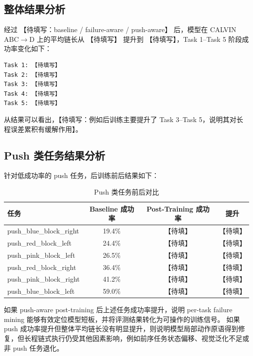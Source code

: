 \documentclass[10pt,a4paper,fontset=none]{ctexart}
\newcommand{\todo}[1]{\textcolor{TodoRed}{【#1】}}
\begin{document}
\subsection{整体结果分析}

经过 \todo{待填写：baseline / failure-aware / push-aware} 后，模型在 CALVIN ABC$\rightarrow$D 上的平均链长从 \todo{待填写} 提升到 \todo{待填写}，Task 1--Task 5 阶段成功率变化如下：

\begin{lstlisting}[caption={Task 1--5 阶段成功率变化}]
Task 1: 【待填写】
Task 2: 【待填写】
Task 3: 【待填写】
Task 4: 【待填写】
Task 5: 【待填写】
\end{lstlisting}

从结果可以看出，\todo{待填写：例如后训练主要提升了 Task 3--Task 5，说明其对长程误差累积有缓解作用}。

\subsection{Push 类任务结果分析}

针对低成功率的 push 任务，后训练前后结果如下：

\begin{table}[H]
\centering
\caption{Push 类任务前后对比}
\small
\begin{tabularx}{0.95\textwidth}{>{\ttfamily\raggedright\arraybackslash}Xccc}
\toprule
任务 & Baseline 成功率 & Post-Training 成功率 & 提升 \\
\midrule
push\_blue\_block\_right & 19.4\% & \todo{待填} & \todo{待填} \\
push\_red\_block\_left & 24.4\% & \todo{待填} & \todo{待填} \\
push\_pink\_block\_left & 26.5\% & \todo{待填} & \todo{待填} \\
push\_red\_block\_right & 36.4\% & \todo{待填} & \todo{待填} \\
push\_pink\_block\_right & 41.2\% & \todo{待填} & \todo{待填} \\
push\_blue\_block\_left & 59.0\% & \todo{待填} & \todo{待填} \\
\bottomrule
\end{tabularx}
\end{table}

如果 push-aware post-training 后上述任务成功率提升，说明 per-task failure mining 能够有效定位模型短板，并将评测结果转化为可操作的训练信号。
如果 push 成功率提升但整体平均链长没有明显提升，则说明模型局部动作原语得到修复，但长程链式执行仍受其他因素影响，例如前序任务状态偏移、视觉泛化不足或非 push 任务退化。
\end{document}
